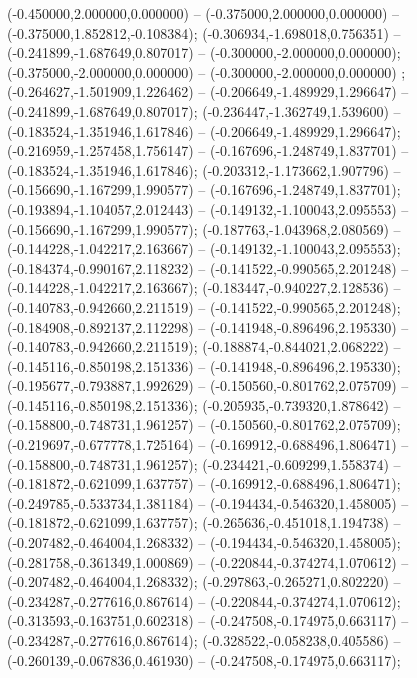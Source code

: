  (-0.450000,2.000000,0.000000) -- (-0.375000,2.000000,0.000000) -- (-0.375000,1.852812,-0.108384);
 (-0.306934,-1.698018,0.756351) -- (-0.241899,-1.687649,0.807017) -- (-0.300000,-2.000000,0.000000);
 (-0.375000,-2.000000,0.000000) -- (-0.300000,-2.000000,0.000000) ;
 (-0.264627,-1.501909,1.226462) -- (-0.206649,-1.489929,1.296647) -- (-0.241899,-1.687649,0.807017);
 (-0.236447,-1.362749,1.539600) -- (-0.183524,-1.351946,1.617846) -- (-0.206649,-1.489929,1.296647);
 (-0.216959,-1.257458,1.756147) -- (-0.167696,-1.248749,1.837701) -- (-0.183524,-1.351946,1.617846);
 (-0.203312,-1.173662,1.907796) -- (-0.156690,-1.167299,1.990577) -- (-0.167696,-1.248749,1.837701);
 (-0.193894,-1.104057,2.012443) -- (-0.149132,-1.100043,2.095553) -- (-0.156690,-1.167299,1.990577);
 (-0.187763,-1.043968,2.080569) -- (-0.144228,-1.042217,2.163667) -- (-0.149132,-1.100043,2.095553);
 (-0.184374,-0.990167,2.118232) -- (-0.141522,-0.990565,2.201248) -- (-0.144228,-1.042217,2.163667);
 (-0.183447,-0.940227,2.128536) -- (-0.140783,-0.942660,2.211519) -- (-0.141522,-0.990565,2.201248);
 (-0.184908,-0.892137,2.112298) -- (-0.141948,-0.896496,2.195330) -- (-0.140783,-0.942660,2.211519);
 (-0.188874,-0.844021,2.068222) -- (-0.145116,-0.850198,2.151336) -- (-0.141948,-0.896496,2.195330);
 (-0.195677,-0.793887,1.992629) -- (-0.150560,-0.801762,2.075709) -- (-0.145116,-0.850198,2.151336);
 (-0.205935,-0.739320,1.878642) -- (-0.158800,-0.748731,1.961257) -- (-0.150560,-0.801762,2.075709);
 (-0.219697,-0.677778,1.725164) -- (-0.169912,-0.688496,1.806471) -- (-0.158800,-0.748731,1.961257);
 (-0.234421,-0.609299,1.558374) -- (-0.181872,-0.621099,1.637757) -- (-0.169912,-0.688496,1.806471);
 (-0.249785,-0.533734,1.381184) -- (-0.194434,-0.546320,1.458005) -- (-0.181872,-0.621099,1.637757);
 (-0.265636,-0.451018,1.194738) -- (-0.207482,-0.464004,1.268332) -- (-0.194434,-0.546320,1.458005);
 (-0.281758,-0.361349,1.000869) -- (-0.220844,-0.374274,1.070612) -- (-0.207482,-0.464004,1.268332);
 (-0.297863,-0.265271,0.802220) -- (-0.234287,-0.277616,0.867614) -- (-0.220844,-0.374274,1.070612);
 (-0.313593,-0.163751,0.602318) -- (-0.247508,-0.174975,0.663117) -- (-0.234287,-0.277616,0.867614);
 (-0.328522,-0.058238,0.405586) -- (-0.260139,-0.067836,0.461930) -- (-0.247508,-0.174975,0.663117);
